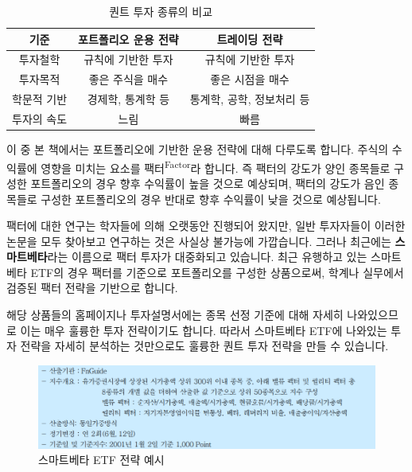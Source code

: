 \documentclass[12pt,]{book}
\begin{document}
\begin{table}[!h]

\caption{\label{tab:unnamed-chunk-2}퀀트 투자 종류의 비교}
\centering
\begin{tabular}{ccc}
\toprule
기준 & 포트폴리오 운용 전략 & 트레이딩 전략\\
\midrule
\rowcolor{gray!6}  투자철학 & 규칙에 기반한 투자 & 규칙에 기반한 투자\\
투자목적 & 좋은 주식을 매수 & 좋은 시점을 매수\\
\rowcolor{gray!6}  학문적 기반 & 경제학, 통계학 등 & 통계학, 공학, 정보처리 등\\
투자의 속도 & 느림 & 빠름\\
\bottomrule
\end{tabular}
\end{table}

이 중 본 책에서는 포트폴리오에 기반한 운용 전략에 대해 다루도록 합니다. 주식의 수익률에 영향을 미치는 요소를 팩터\textsuperscript{Factor}라 합니다. 즉 팩터의 강도가 양인 종목들로 구성한 포트폴리오의 경우 향후 수익률이 높을 것으로 예상되며, 팩터의 강도가 음인 종목들로 구성한 포트폴리오의 경우 반대로 향후 수익률이 낮을 것으로 예상됩니다.

팩터에 대한 연구는 학자들에 의해 오랫동안 진행되어 왔지만, 일반 투자자들이 이러한 논문을 모두 찾아보고 연구하는 것은 사실상 불가능에 가깝습니다. 그러나 최근에는 \textbf{스마트베타}라는 이름으로 팩터 투자가 대중화되고 있습니다. 최근 유행하고 있는 스마트베타 ETF의 경우 팩터를 기준으로 포트폴리오를 구성한 상품으로써, 학계나 실무에서 검증된 팩터 전략을 기반으로 합니다.

해당 상품들의 홈페이지나 투자설명서에는 종목 선정 기준에 대해 자세히 나와있으므로 이는 매우 훌륭한 투자 전략이기도 합니다. 따라서 스마트베타 ETF에 나와있는 투자 전략을 자세히 분석하는 것만으로도 훌륭한 퀀트 투자 전략을 만들 수 있습니다.

\begin{figure}[h]

{\centering \includegraphics[width=0.8\linewidth]{images/factor_smartbeta} 

}

\caption{스마트베타 ETF 전략 예시}\label{fig:unnamed-chunk-3}
\end{figure}
\end{document}
